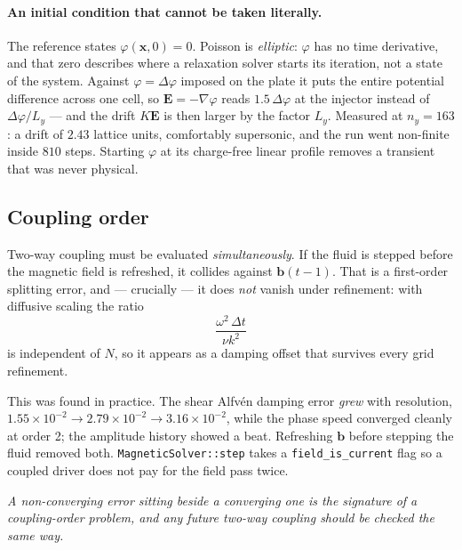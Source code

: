 \documentclass[11pt,a4paper]{article}
\newcommand{\code}[1]{\texttt{\small #1}}
\newcommand{\bb}{\bm{b}}
\newcommand{\xx}{\bm{x}}
\begin{document}
\paragraph{An initial condition that cannot be taken literally.} The reference
states $\varphi(\xx,0)=0$. Poisson is \emph{elliptic}: $\varphi$ has no time
derivative, and that zero describes where a relaxation solver starts its
iteration, not a state of the system. Against $\varphi=\Delta\varphi$ imposed on
the plate it puts the entire potential difference across one cell, so
$\bm{E}=-\nabla\varphi$ reads $1.5\,\Delta\varphi$ at the injector instead of
$\Delta\varphi/L_y$ --- and the drift $K\bm{E}$ is then larger by the factor
$L_y$. Measured at $n_y=163$: a drift of $2.43$ lattice units, comfortably
supersonic, and the run went non-finite inside $810$ steps. Starting $\varphi$
at its charge-free linear profile removes a transient that was never physical.

\subsection{Coupling order}
\label{sec:couplingorder}

Two-way coupling must be evaluated \emph{simultaneously}. If the fluid is stepped
before the magnetic field is refreshed, it collides against $\bb(t-1)$. That is a
first-order splitting error, and --- crucially --- it does \emph{not} vanish under
refinement: with diffusive scaling the ratio
\begin{equation}
  \frac{\omega^2\,\Delta t}{\nu k^2}
\end{equation}
is independent of $N$, so it appears as a damping offset that survives every
grid refinement.

This was found in practice. The shear Alfv\'en damping error \emph{grew} with
resolution, $1.55\times10^{-2}\to2.79\times10^{-2}\to3.16\times10^{-2}$, while the
phase speed converged cleanly at order 2; the amplitude history showed a beat.
Refreshing $\bb$ before stepping the fluid removed both. \code{MagneticSolver::step}
takes a \code{field\_is\_current} flag so a coupled driver does not pay for the
field pass twice.

\medskip
\noindent\emph{A non-converging error sitting beside a converging one is the
signature of a coupling-order problem, and any future two-way coupling should be
checked the same way.}

\end{document}
